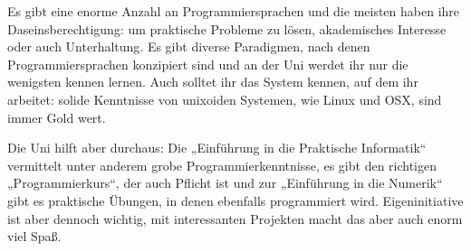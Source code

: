 Es gibt eine enorme Anzahl an Programmiersprachen und die meisten haben ihre
Daseinsberechtigung: um praktische Probleme zu lösen, akademisches Interesse
oder auch Unterhaltung. Es gibt diverse Paradigmen, nach denen
Programmiersprachen konzipiert sind und an der Uni werdet ihr nur die wenigsten
kennen lernen. Auch solltet ihr das System kennen, auf dem ihr arbeitet: solide
Kenntnisse von unixoiden Systemen, wie Linux und OSX, sind immer Gold wert.

Die Uni hilft aber durchaus: Die „Einführung in die Praktische Informatik“
vermittelt unter anderem grobe Programmierkenntnisse, es gibt den richtigen „Programmierkurs“,
der auch Pflicht ist und zur „Einführung in die Numerik“ gibt es praktische Übungen, in denen
ebenfalls programmiert wird. Eigeninitiative ist aber dennoch wichtig,
mit interessanten Projekten macht das aber auch enorm viel Spaß.

\vspace{-\parskip}
